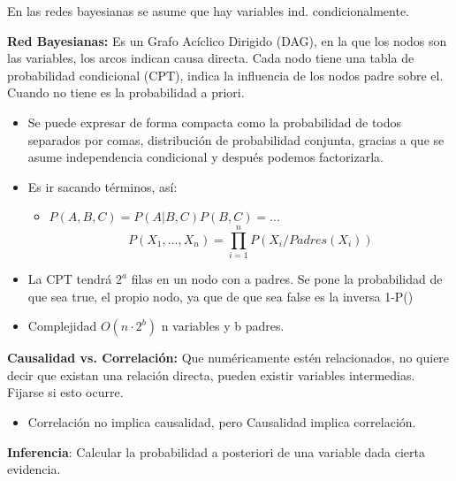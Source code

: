 \documentclass[12pt, twoside, openright]{report} %
\begin{document}
En las redes bayesianas se asume que hay variables ind.
condicionalmente.



  \textbf{Red Bayesianas:} Es un Grafo Acíclico Dirigido (DAG), en la
  que los nodos son las variables, los arcos indican causa directa. Cada
  nodo tiene una tabla de probabilidad condicional (CPT), indica la
  influencia de los nodos padre sobre el. Cuando no tiene es la
  probabilidad a priori.

  
  \begin{itemize}
  \item Se puede expresar de forma compacta como la probabilidad de todos
    separados por comas, distribución de probabilidad conjunta, gracias
    a que se asume independencia condicional y después podemos
    factorizarla.
    
  \item Es ir sacando términos, así:
    

    \begin{itemize}
    \item $P(A, B, C)= P(A| B,C)P(B,C)=...$
     $$P(X_1, ..., X_n)=\prod^n_{i=1} P(X_i/Padres(X_i))$$
      
    \end{itemize}
  \item La CPT tendrá $2^a$ filas en un nodo con a padres. Se pone la
    probabilidad de que sea true, el propio nodo, ya que de que sea
    false es la inversa 1-P()
    
  \item Complejidad $O(n\cdot 2^b)$ n variables y b padres.
    
  \end{itemize}

 
  \textbf{Causalidad vs. Correlación:} Que numéricamente estén
  relacionados, no quiere decir que existan una relación directa, pueden
  existir variables intermedias. Fijarse si esto ocurre.
  

  \begin{itemize}
  \item Correlación no implica causalidad, pero Causalidad implica
    correlación.
    
  \end{itemize}

 
  \textbf{Inferencia}: Calcular la probabilidad a posteriori de una
  variable dada cierta evidencia.
  
\end{document}

